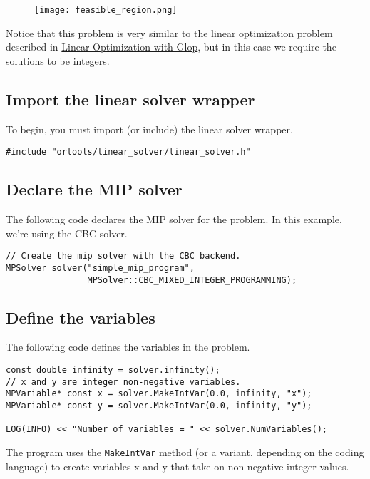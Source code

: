 \documentclass[a4paper,12pt,notitlepage,twoside,openright]{article}
\begin{document}
\begin{figure}[H]
\centering
\texttt{[image: feasible\_region.png]}
\end{figure}

Notice that this problem is very similar to the linear optimization problem described in \href{https://developers.google.com/optimization/lp/glop}{Linear Optimization with Glop}, but in this case we require the solutions to be integers.

\subsection{Import the linear solver wrapper}

To begin, you must import (or include) the linear solver wrapper.

\begin{verbatim}
#include "ortools/linear_solver/linear_solver.h"
\end{verbatim}

\subsection{Declare the MIP solver}

The following code declares the MIP solver for the problem. In this example, we're using the CBC solver.

\begin{verbatim}
// Create the mip solver with the CBC backend.
MPSolver solver("simple_mip_program",
                MPSolver::CBC_MIXED_INTEGER_PROGRAMMING);
\end{verbatim}

\subsection{Define the variables}

The following code defines the variables in the problem.

\begin{verbatim}
const double infinity = solver.infinity();
// x and y are integer non-negative variables.
MPVariable* const x = solver.MakeIntVar(0.0, infinity, "x");
MPVariable* const y = solver.MakeIntVar(0.0, infinity, "y");

LOG(INFO) << "Number of variables = " << solver.NumVariables();
\end{verbatim}

The program uses the \texttt{MakeIntVar} method (or a variant, depending on the coding language) to create variables x and y that take on non-negative integer values.
\end{document}
